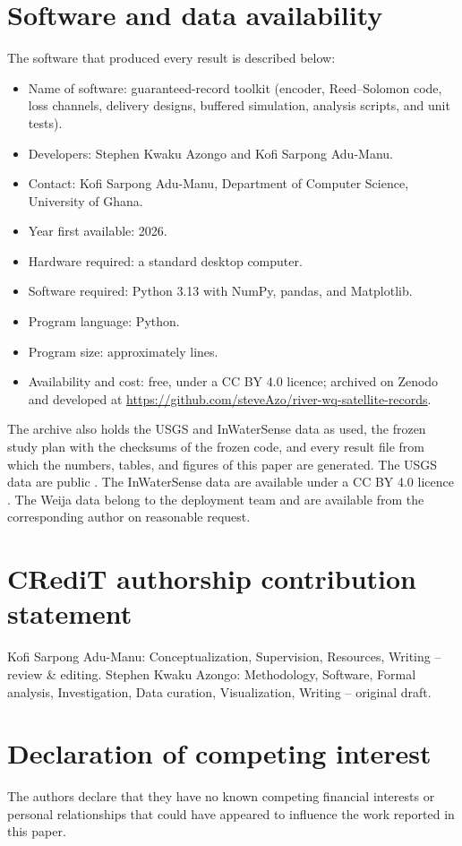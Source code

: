 \section*{Software and data availability}
The software that produced every result is described below:
\begin{itemize}
  \item Name of software: guaranteed-record toolkit (encoder, Reed--Solomon code, loss channels, delivery designs, buffered simulation, analysis scripts, and unit tests).
  \item Developers: Stephen Kwaku Azongo and Kofi Sarpong Adu-Manu.
  \item Contact: Kofi Sarpong Adu-Manu, Department of Computer Science, University of Ghana.
  \item Year first available: 2026.
  \item Hardware required: a standard desktop computer.
  \item Software required: Python 3.13 with NumPy, pandas, and Matplotlib.
  \item Program language: Python.
  \item Program size: approximately \progLines{} lines.
  \item Availability and cost: free, under a CC BY 4.0 licence; archived on Zenodo \citep{azongo2026code} and developed at \url{https://github.com/steveAzo/river-wq-satellite-records}.
\end{itemize}
The archive also holds the USGS and InWaterSense data as used, the frozen study plan with the checksums of the frozen code, and every result file from which the numbers, tables, and figures of this paper are generated.
The USGS data are public \citep{usgs2016nwis}. The InWaterSense data are available under a CC BY 4.0 licence \citep{ahmedi2022data}. The Weija data belong to the deployment team and are available from the corresponding author on reasonable request.

\section*{CRediT authorship contribution statement}
Kofi Sarpong Adu-Manu: Conceptualization, Supervision, Resources, Writing -- review \& editing. Stephen Kwaku Azongo: Methodology, Software, Formal analysis, Investigation, Data curation, Visualization, Writing -- original draft.

\section*{Declaration of competing interest}
The authors declare that they have no known competing financial interests or personal relationships that could have appeared to influence the work reported in this paper.

